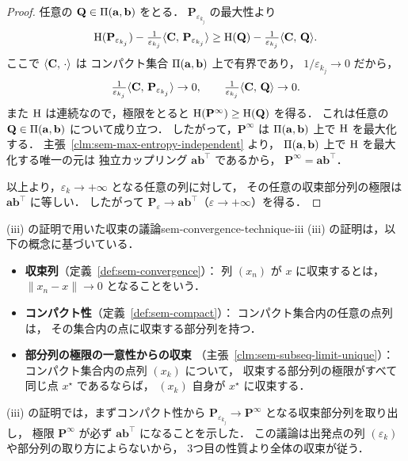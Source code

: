 \begin{proof}
  任意の $\mathbf{Q} \in \Pi(\mathbf{a},\mathbf{b})$ をとる．
  $\mathbf{P}_{\varepsilon_{k_j}}$ の最大性より
  \[
    \mathrm{H}(\mathbf{P}_{\varepsilon_{k_j}})
    - \tfrac{1}{\varepsilon_{k_j}}\langle \mathbf{C},\, \mathbf{P}_{\varepsilon_{k_j}} \rangle
    \geq
    \mathrm{H}(\mathbf{Q})
    - \tfrac{1}{\varepsilon_{k_j}}\langle \mathbf{C},\, \mathbf{Q} \rangle.
  \]
  ここで $\langle \mathbf{C},\, \cdot \rangle$ は
  コンパクト集合 $\Pi(\mathbf{a},\mathbf{b})$ 上で有界であり，
  $1/\varepsilon_{k_j} \to 0$ だから，
  \[
    \tfrac{1}{\varepsilon_{k_j}}\langle \mathbf{C},\, \mathbf{P}_{\varepsilon_{k_j}} \rangle \to 0,
    \qquad
    \tfrac{1}{\varepsilon_{k_j}}\langle \mathbf{C},\, \mathbf{Q} \rangle \to 0.
  \]
  また $\mathrm{H}$ は連続なので，極限をとると
  $\mathrm{H}(\mathbf{P}^\infty) \geq \mathrm{H}(\mathbf{Q})$ を得る．
  これは任意の $\mathbf{Q} \in \Pi(\mathbf{a},\mathbf{b})$
  について成り立つ．
  したがって，$\mathbf{P}^\infty$ は
  $\Pi(\mathbf{a},\mathbf{b})$ 上で $\mathrm{H}$ を最大化する．
  主張~\ref{clm:sem-max-entropy-independent} より，
  $\Pi(\mathbf{a},\mathbf{b})$ 上で $\mathrm{H}$ を最大化する唯一の元は
  独立カップリング $\mathbf{a}\mathbf{b}^\top$ であるから，
  $\mathbf{P}^\infty = \mathbf{a}\mathbf{b}^\top$．

  以上より，$\varepsilon_k \to +\infty$ となる任意の列に対して，
  その任意の収束部分列の極限は $\mathbf{a}\mathbf{b}^\top$ に等しい．
  したがって
  $\mathbf{P}_\varepsilon \to \mathbf{a}\mathbf{b}^\top$（$\varepsilon \to +\infty$）を得る．
\end{proof}

\begin{remark}{(iii) の証明で用いた収束の議論}{sem-convergence-technique-iii}
  (iii) の証明は，以下の概念に基づいている．

  \begin{itemize}
    \item \textbf{収束列}（定義~\ref{def:sem-convergence}）：
      列 $(x_n)$ が $x$ に収束するとは，
      $\|x_n - x\| \to 0$ となることをいう．
    \item \textbf{コンパクト性}（定義~\ref{def:sem-compact}）：
      コンパクト集合内の任意の点列は，
      その集合内の点に収束する部分列を持つ．
    \item \textbf{部分列の極限の一意性からの収束}
      （主張~\ref{clm:sem-subseq-limit-unique}）：
      コンパクト集合内の点列 $(x_k)$ について，
      収束する部分列の極限がすべて同じ点 $x^\star$ であるならば，
      $(x_k)$ 自身が $x^\star$ に収束する．
  \end{itemize}

  (iii) の証明では，まずコンパクト性から
  $\mathbf{P}_{\varepsilon_{k_j}} \to \mathbf{P}^\infty$
  となる収束部分列を取り出し，
  極限 $\mathbf{P}^\infty$ が必ず $\mathbf{a}\mathbf{b}^\top$ になることを示した．
  この議論は出発点の列 $(\varepsilon_k)$ や部分列の取り方によらないから，
  3つ目の性質より全体の収束が従う．
\end{remark}

